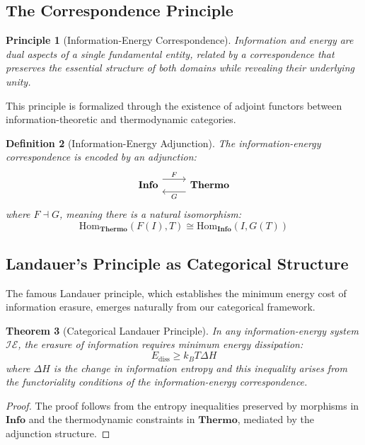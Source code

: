 \documentclass[12pt,a4paper]{article}
\newtheorem{theorem}{Theorem}[section]
\newtheorem{definition}[theorem]{Definition}
\newtheorem{principle}[theorem]{Principle}
\newcommand{\Hom}{\mathrm{Hom}}
\begin{document}
\subsection{The Correspondence Principle}

\begin{principle}[Information-Energy Correspondence]
Information and energy are dual aspects of a single fundamental entity, related by a correspondence that preserves the essential structure of both domains while revealing their underlying unity.
\end{principle}

This principle is formalized through the existence of adjoint functors between information-theoretic and thermodynamic categories.

\begin{definition}[Information-Energy Adjunction]
The information-energy correspondence is encoded by an adjunction:
\[
\begin{tikzcd}
\mathbf{Info} \arrow[r, shift left=1.5ex, "F"] & \mathbf{Thermo} \arrow[l, shift left=1.5ex, "G"]
\end{tikzcd}
\]
where $F \dashv G$, meaning there is a natural isomorphism:
\[
\Hom_{\mathbf{Thermo}}(F(I), T) \cong \Hom_{\mathbf{Info}}(I, G(T))
\]
\end{definition}

\subsection{Landauer's Principle as Categorical Structure}

The famous Landauer principle, which establishes the minimum energy cost of information erasure, emerges naturally from our categorical framework.

\begin{theorem}[Categorical Landauer Principle]
In any information-energy system $\mathcal{IE}$, the erasure of information requires minimum energy dissipation:
\[
E_{\text{diss}} \geq k_B T \Delta H
\]
where $\Delta H$ is the change in information entropy and this inequality arises from the functoriality conditions of the information-energy correspondence.
\end{theorem}

\begin{proof}
The proof follows from the entropy inequalities preserved by morphisms in $\mathbf{Info}$ and the thermodynamic constraints in $\mathbf{Thermo}$, mediated by the adjunction structure.
\end{proof}
\end{document}
